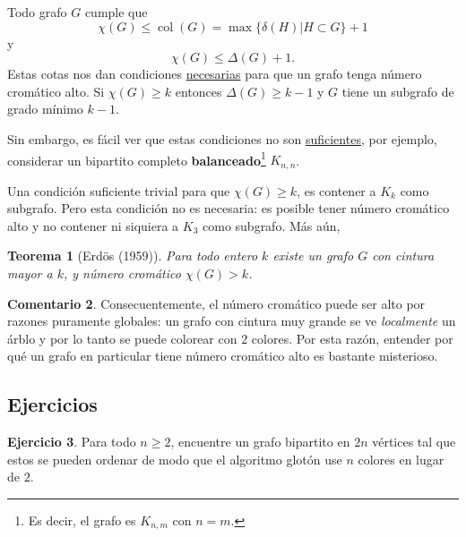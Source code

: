 \documentclass[12pt]{report}
\theoremstyle{plain}
\newtheorem{theorem}{Teorema}[section]
\theoremstyle{definition}
\newtheorem{remark}[theorem]{Comentario}
\newtheorem{exercise}[theorem]{Ejercicio}
\newcommand{\col}[1]{\operatorname{col} (#1)}
\begin{document}

Todo grafo $G$ cumple que
\[
    \chi (G) \leq \col{G} = \max \{ \delta(H) | H \subset G \} +1
\]
y
\[
    \chi (G) \leq \Delta (G) + 1.
\]
Estas cotas nos dan condiciones \underline{necesarias} para que un grafo tenga número cromático alto. Si $\chi (G) \geq k$ entonces $\Delta (G) \geq k -1$ y $G$ tiene un subgrafo de grado mínimo $k-1$.

Sin embargo, es fácil ver que estas condiciones no son \underline{suficientes}, por ejemplo, considerar un bipartito completo \textbf{balanceado}\footnote{Es decir, el grafo es $K_{n,m}$ con $n = m$.} $K_{n,n}$.

Una condición suficiente trivial para que $\chi (G) \geq k$, es contener a $K_k$ como subgrafo. Pero esta condición no es necesaria: es posible tener número cromático alto y no contener ni siquiera a $K_3$ como subgrafo. Más aún,

\begin{theorem}[Erdös (1959)]
Para todo entero $k$ existe un grafo $G$ con cintura mayor a $k$, y número cromático $\chi (G) > k$.
\end{theorem}

\begin{remark}
Consecuentemente, el número cromático puede ser alto por razones puramente globales: un grafo con cintura muy grande se ve \textit{localmente} un árblo y por lo tanto se puede colorear con $2$ colores. Por esta razón, entender por qué un grafo en particular tiene número cromático alto es bastante misterioso.
\end{remark}



\subsection{Ejercicios}

\begin{exercise}
Para todo $n \geq 2$, encuentre un grafo bipartito en $2n$ vértices tal que estos se pueden ordenar de modo que el algoritmo glotón use $n$ colores en lugar de $2$.
\end{exercise}
\end{document}
